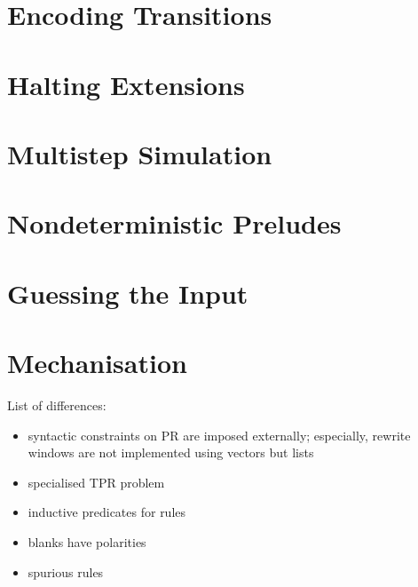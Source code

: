 
\section{Encoding Transitions}

\section{Halting Extensions}

\section{Multistep Simulation}

\section{Nondeterministic Preludes}

\section{Guessing the Input}

\section{Mechanisation}

List of differences:
\begin{itemize}
  \item syntactic constraints on PR are imposed externally; especially, rewrite windows are not implemented using vectors but lists
  \item specialised TPR problem 
  \item inductive predicates for rules
  \item blanks have polarities
  \item spurious rules
\end{itemize}
